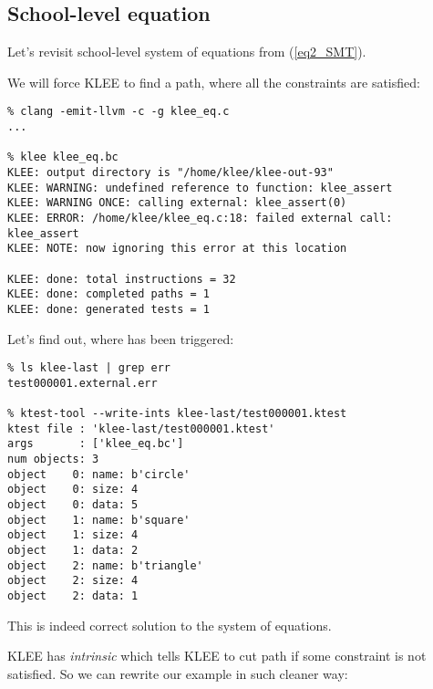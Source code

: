 \subsection{School-level equation}

Let's revisit school-level system of equations from (\ref{eq2_SMT}).

We will force KLEE to find a path, where all the constraints are satisfied:



\begin{lstlisting}
% clang -emit-llvm -c -g klee_eq.c
...

% klee klee_eq.bc
KLEE: output directory is "/home/klee/klee-out-93"
KLEE: WARNING: undefined reference to function: klee_assert
KLEE: WARNING ONCE: calling external: klee_assert(0)
KLEE: ERROR: /home/klee/klee_eq.c:18: failed external call: klee_assert
KLEE: NOTE: now ignoring this error at this location

KLEE: done: total instructions = 32
KLEE: done: completed paths = 1
KLEE: done: generated tests = 1
\end{lstlisting}

Let's find out, where  has been triggered:

\begin{lstlisting}
% ls klee-last | grep err
test000001.external.err

% ktest-tool --write-ints klee-last/test000001.ktest
ktest file : 'klee-last/test000001.ktest'
args       : ['klee_eq.bc']
num objects: 3
object    0: name: b'circle'
object    0: size: 4
object    0: data: 5
object    1: name: b'square'
object    1: size: 4
object    1: data: 2
object    2: name: b'triangle'
object    2: size: 4
object    2: data: 1
\end{lstlisting}

This is indeed correct solution to the system of equations.

KLEE has \textit{intrinsic}  which tells KLEE to cut path if some constraint is not satisfied.
So we can rewrite our example in such cleaner way:




